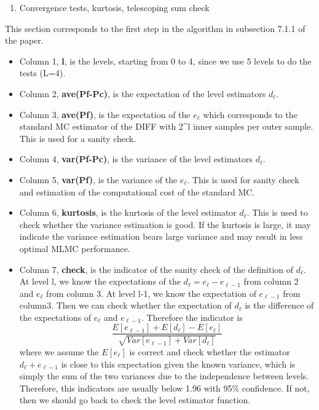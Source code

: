 \documentclass[
]{article}
\providecommand{\tightlist}{%
  \setlength{\itemsep}{0pt}\setlength{\parskip}{0pt}}
\begin{document}
\begin{enumerate}
\def\labelenumi{\arabic{enumi}.}
\tightlist
\item
  Convergence tests, kurtosis, telescoping sum check
\end{enumerate}

This section corresponds to the first step in the algorithm in
subsection 7.1.1 of the paper.

\begin{itemize}
\tightlist
\item
  Column 1, \textbf{l}, is the levels, starting from 0 to 4, since we
  use 5 levels to do the tests (L=4).
\item
  Column 2, \textbf{ave(Pf-Pc)}, is the expectation of the level
  estimators \(d_\ell\).
\item
  Column 3, \textbf{ave(Pf)}, is the expectation of the \(e_\ell\) which
  corresponds to the standard MC estimator of the DIFF with 2\^{}l inner
  samples per outer sample. This is used for a sanity check.
\item
  Column 4, \textbf{var(Pf-Pc)}, is the variance of the level estimators
  \(d_\ell\).
\item
  Column 5, \textbf{var(Pf)}, is the variance of the \(e_\ell\). This is
  used for sanity check and estimation of the computational cost of the
  standard MC.
\item
  Column 6, \textbf{kurtosis}, is the kurtosis of the level estimator
  \(d_\ell\). This is used to check whether the variance estimation is
  good. If the kurtosis is large, it may indicate the variance
  estimation bears large variance and may result in less optimal MLMC
  performance.
\item
  Column 7, \textbf{check}, is the indicator of the sanity check of the
  definition of \(d_\ell\). At level l, we know the expectations of the
  \(d_\ell = e_\ell - e_{\ell-1}\) from column 2 and \(e_\ell\) from
  column 3. At level l-1, we know the expectation of \(e_{\ell-1}\) from
  column3. Then we can check whether the expectation of \(d_\ell\) is
  the difference of the expectations of \(e_\ell\) and \(e_{\ell-1}.\)
  Therefore the indicator is
  \[ \frac{E[e_{\ell-1}]+E[d_\ell]-E[e_\ell]}{\sqrt{Var[e_{\ell-1}] + Var[d_\ell]}}\]
  where we assume the \(E[e_\ell]\) is correct and check whether the
  estimator \(d_\ell+e_{\ell-1}\) is close to this expectation given the
  known variance, which is simply the sum of the two variances due to
  the independence between levels. Therefore, this indicators are
  usually below 1.96 with 95\% confidence. If not, then we should go
  back to check the level estimator function.
\end{itemize}
\end{document}

